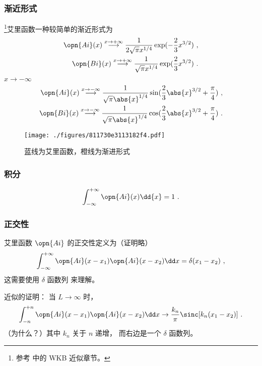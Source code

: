 \subsubsection{渐近形式}
\footnote{参考 \cite{GriffQ} 中的 WKB 近似章节。}艾里函数一种较简单的渐近形式为
\begin{align}\label{eq_AiryF_3}
\opn{Ai}(x) \overset{x \to +\infty}{\longrightarrow} \frac{1}{2\sqrt{\pi} x^{1/4}} \exp(-\frac{2}{3}x^{3/2})~,\\
\opn{Bi}(x) \overset{x \to +\infty}{\longrightarrow} \frac{1}{\sqrt{\pi} x^{1/4}} \exp(\frac{2}{3}x^{3/2})~.
\end{align}
$x \to -\infty$
\begin{align}
\opn{Ai}(x) \overset{x \to -\infty}{\longrightarrow} \frac{1}{\sqrt{\pi} \abs{x}^{1/4}} \sin(\frac{2}{3}\abs{x}^{3/2}+\frac{\pi}{4})~,\\
\opn{Bi}(x) \overset{x \to -\infty}{\longrightarrow} \frac{1}{\sqrt{\pi} \abs{x}^{1/4}} \cos(\frac{2}{3}\abs{x}^{3/2}+\frac{\pi}{4})~.
\end{align}
\begin{figure}[ht]
\centering
\texttt{[image: ./figures/811730e3113182f4.pdf]}
\caption{蓝线为艾里函数，橙线为渐进形式} \label{fig_AiryF_2}
\end{figure}

\subsubsection{积分}
\begin{equation}
\int_{-\infty}^{+\infty} \opn{Ai}(x) \dd{x} = 1~.
\end{equation}


\subsubsection{正交性}
艾里函数 $\opn{Ai}$ 的正交性定义为（证明略）
\begin{equation}
\int_{-\infty}^{+\infty} \opn{Ai}(x-x_1)\opn{Ai}(x-x_2)\dd x=\delta(x_1-x_2)~,
\end{equation}
这需要使用 $\delta$ 函数列 来理解。

近似的证明： 当 $L\to \infty$ 时，
\begin{equation}
\int_{-n}^{+n} \opn{Ai}(x-x_1)\opn{Ai}(x-x_2)\dd x \to \frac{k_n}{\pi}\sinc[k_n (x_1 - x_2)]~.
\end{equation}
（为什么？）其中 $k_n$ 关于 $n$ 递增， 而右边是一个 $\delta$ 函数列。%

